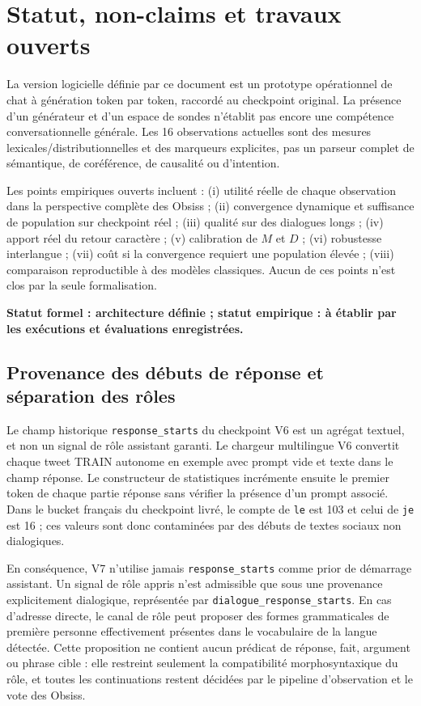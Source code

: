 \documentclass[11pt,a4paper]{report}
\begin{document}
\chapter{Statut, non-claims et travaux ouverts}
La version logicielle définie par ce document est un prototype opérationnel de chat à génération token par token, raccordé au checkpoint original. La présence d'un générateur et d'un espace de sondes n'établit pas encore une compétence conversationnelle générale. Les 16 observations actuelles sont des mesures lexicales/distributionnelles et des marqueurs explicites, pas un parseur complet de sémantique, de coréférence, de causalité ou d'intention.

Les points empiriques ouverts incluent : (i) utilité réelle de chaque observation dans la perspective complète des Obsiss ; (ii) convergence dynamique et suffisance de population sur checkpoint réel ; (iii) qualité sur des dialogues longs ; (iv) apport réel du retour caractère ; (v) calibration de $M$ et $D$ ; (vi) robustesse interlangue ; (vii) coût si la convergence requiert une population élevée ; (viii) comparaison reproductible à des modèles classiques. Aucun de ces points n'est clos par la seule formalisation.

\begin{center}
\textbf{Statut formel : architecture définie ; statut empirique : à établir par les exécutions et évaluations enregistrées.}
\end{center}


\section{Provenance des débuts de réponse et séparation des rôles}
\label{sec:role-provenance}

Le champ historique \texttt{response\_starts} du checkpoint V6 est un agrégat textuel, et non un signal de rôle assistant garanti. Le chargeur multilingue V6 convertit chaque tweet TRAIN autonome en exemple avec prompt vide et texte dans le champ réponse. Le constructeur de statistiques incrémente ensuite le premier token de chaque partie réponse sans vérifier la présence d'un prompt associé. Dans le bucket français du checkpoint livré, le compte de \texttt{le} est 103 et celui de \texttt{je} est 16 ; ces valeurs sont donc contaminées par des débuts de textes sociaux non dialogiques.

En conséquence, V7 n'utilise jamais \texttt{response\_starts} comme prior de démarrage assistant. Un signal de rôle appris n'est admissible que sous une provenance explicitement dialogique, représentée par \texttt{dialogue\_response\_starts}. En cas d'adresse directe, le canal de rôle peut proposer des formes grammaticales de première personne effectivement présentes dans le vocabulaire de la langue détectée. Cette proposition ne contient aucun prédicat de réponse, fait, argument ou phrase cible : elle restreint seulement la compatibilité morphosyntaxique du rôle, et toutes les continuations restent décidées par le pipeline d'observation et le vote des Obsiss.
\end{document}
